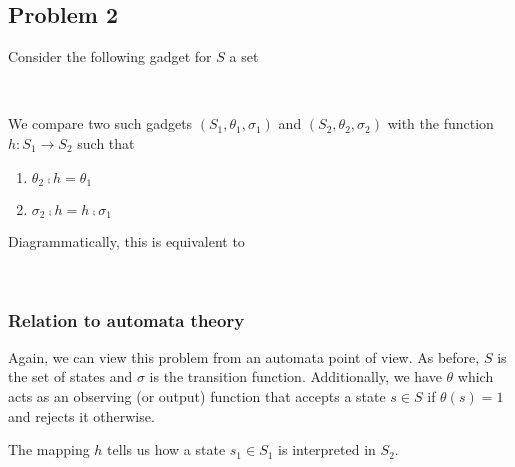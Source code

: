 \subsection{Problem 2}
Consider the following gadget for $S$ a set
\begin{center}
     \\[3mm]
\end{center}
We compare two such gadgets $(S_1, \theta_1, \sigma_1)$ and $(S_2, \theta_2, \sigma_2)$
with the function $h: S_1 \to S_2$ such that
\begin{enumerate}
    \item $\theta_2 \comp h = \theta_1$
    \item $\sigma_2 \comp h = h \comp \sigma_1$
\end{enumerate}
Diagrammatically, this is equivalent to
\begin{center}
     \\[3mm]
\end{center}

\subsubsection{Relation to automata theory}
Again, we can view this problem from an automata point of view. As before, $S$
is the set of states and $\sigma$ is the transition function. Additionally, we
have $\theta$ which acts as an observing (or output) function that accepts a
state $s \in S$ if $\theta(s) = 1$ and rejects it otherwise.

The mapping $h$ tells us how a state $s_1 \in S_1$ is interpreted in $S_2$.

